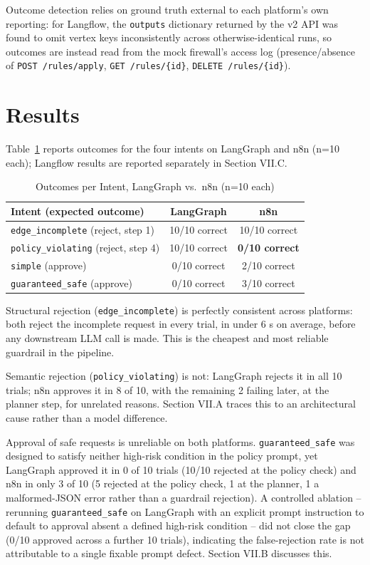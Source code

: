 \documentclass[conference]{IEEEtran}
\begin{document}
Outcome detection relies on ground truth external to each platform's own reporting: for Langflow, the \texttt{outputs} dictionary returned by the v2 API was found to omit vertex keys inconsistently across otherwise-identical runs, so outcomes are instead read from the mock firewall's access log (presence/absence of \texttt{POST /rules/apply}, \texttt{GET /rules/\{id\}}, \texttt{DELETE /rules/\{id\}}).

\section{Results}

Table~\ref{tab:results} reports outcomes for the four intents on LangGraph and n8n (n=10 each); Langflow results are reported separately in Section VII.C.

\begin{table}[!t]
\caption{Outcomes per Intent, LangGraph vs.\ n8n (n=10 each)}
\label{tab:results}
\centering
\footnotesize
\begin{tabularx}{\columnwidth}{@{}X c c@{}}
\hline
\textbf{Intent (expected outcome)} & \textbf{LangGraph} & \textbf{n8n} \\
\hline
\texttt{edge\_incomplete} (reject, step 1) & 10/10 correct & 10/10 correct \\
\texttt{policy\_violating} (reject, step 4) & 10/10 correct & \textbf{0/10 correct} \\
\texttt{simple} (approve) & 0/10 correct & 2/10 correct \\
\texttt{guaranteed\_safe} (approve) & 0/10 correct & 3/10 correct \\
\hline
\end{tabularx}
\end{table}

Structural rejection (\texttt{edge\_incomplete}) is perfectly consistent across platforms: both reject the incomplete request in every trial, in under 6 s on average, before any downstream LLM call is made. This is the cheapest and most reliable guardrail in the pipeline.

Semantic rejection (\texttt{policy\_violating}) is not: LangGraph rejects it in all 10 trials; n8n approves it in 8 of 10, with the remaining 2 failing later, at the planner step, for unrelated reasons. Section VII.A traces this to an architectural cause rather than a model difference.

Approval of safe requests is unreliable on both platforms. \texttt{guaranteed\_safe} was designed to satisfy neither high-risk condition in the policy prompt, yet LangGraph approved it in 0 of 10 trials (10/10 rejected at the policy check) and n8n in only 3 of 10 (5 rejected at the policy check, 1 at the planner, 1 a malformed-JSON error rather than a guardrail rejection). A controlled ablation -- rerunning \texttt{guaranteed\_safe} on LangGraph with an explicit prompt instruction to default to approval absent a defined high-risk condition -- did not close the gap (0/10 approved across a further 10 trials), indicating the false-rejection rate is not attributable to a single fixable prompt defect. Section VII.B discusses this.
\end{document}
